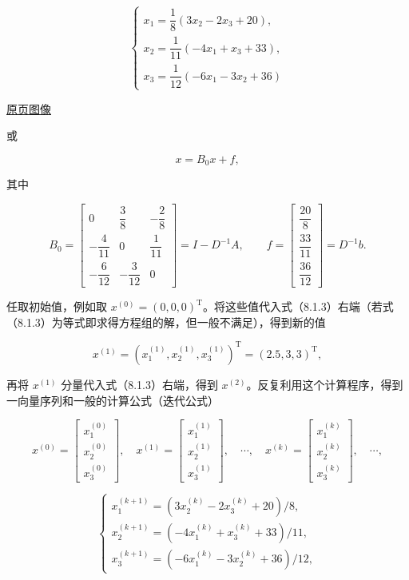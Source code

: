 \documentclass[
  10pt,
  fontset=fandol]{ctexart}
\begin{document}
\[
\begin{cases}
x_1=\dfrac18(3x_2-2x_3+20),\\[4pt]
x_2=\dfrac1{11}(-4x_1+x_3+33),\\[4pt]
x_3=\dfrac1{12}(-6x_1-3x_2+36)
\end{cases}
\tag{8.1.3}
\]

\href{../../source-images/pdf-216.jpeg}{原页图像}

或

\[
x=B_0x+f,
\]

其中

\[
B_0=\begin{bmatrix}
0&\dfrac38&-\dfrac28\\[4pt]
-\dfrac4{11}&0&\dfrac1{11}\\[4pt]
-\dfrac6{12}&-\dfrac3{12}&0
\end{bmatrix}=I-D^{-1}A,\qquad
f=\begin{bmatrix}\dfrac{20}8\\[4pt]\dfrac{33}{11}\\[4pt]\dfrac{36}{12}\end{bmatrix}=D^{-1}b.
\]

任取初始值，例如取 \(x^{(0)}=(0,0,0)^{\mathrm T}\)。将这些值代入式（8.1.3）右端（若式（8.1.3）为等式即求得方程组的解，但一般不满足），得到新的值

\[
x^{(1)}=(x_1^{(1)},x_2^{(1)},x_3^{(1)})^{\mathrm T}=(2.5,3,3)^{\mathrm T},
\]

再将 \(x^{(1)}\) 分量代入式（8.1.3）右端，得到 \(x^{(2)}\)。反复利用这个计算程序，得到一向量序列和一般的计算公式（迭代公式）

\[
x^{(0)}=\begin{bmatrix}x_1^{(0)}\\x_2^{(0)}\\x_3^{(0)}\end{bmatrix},\quad
x^{(1)}=\begin{bmatrix}x_1^{(1)}\\x_2^{(1)}\\x_3^{(1)}\end{bmatrix},\quad\cdots,\quad
x^{(k)}=\begin{bmatrix}x_1^{(k)}\\x_2^{(k)}\\x_3^{(k)}\end{bmatrix},\quad\cdots,
\]

\[
\begin{cases}
x_1^{(k+1)}=(3x_2^{(k)}-2x_3^{(k)}+20)/8,\\
x_2^{(k+1)}=(-4x_1^{(k)}+x_3^{(k)}+33)/11,\\
x_3^{(k+1)}=(-6x_1^{(k)}-3x_2^{(k)}+36)/12,
\end{cases}
\tag{8.1.4}
\]
\end{document}
